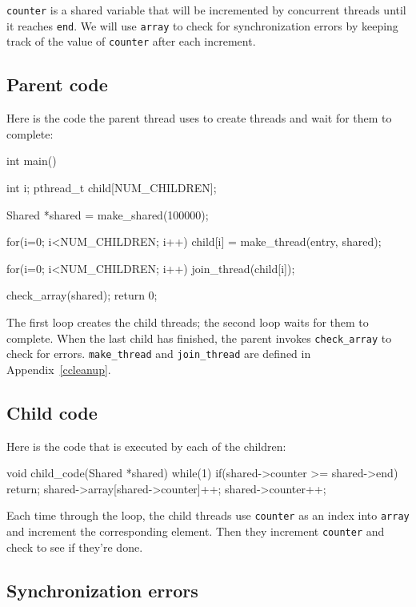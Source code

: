 \documentclass{book}
\begin{document}
{\tt counter} is a shared variable that will be incremented by
concurrent threads until it reaches {\tt end}.  We will use
    {\tt array} to check for synchronization errors by keeping track
of the value of {\tt counter} after each increment.

\subsection{Parent code}

Here is the code the parent thread uses to create threads
and wait for them to complete:

\begin{unbreakable}[title={}]{}
int main() {
 int i;
 pthread_t child[NUM_CHILDREN];

 Shared *shared = make_shared(100000);

 for(i=0; i<NUM_CHILDREN; i++) {
  child[i] = make_thread(entry, shared);
 }

 for(i=0; i<NUM_CHILDREN; i++) {
  join_thread(child[i]);
 }

 check_array(shared);
 return 0;
}
\end{unbreakable}

The first loop creates the child threads; the second loop waits
for them to complete.  When the last child has finished, the parent
invokes {\tt check\_array} to check for errors.
    {\tt make\_thread} and {\tt join\_thread} are defined in
Appendix~\ref{ccleanup}.

\subsection{Child code}

Here is the code that is executed by each of the children:

\begin{unbreakable}[title={}]{}
void child_code(Shared *shared) {
  while(1) {
    if(shared->counter >= shared->end) {
      return;
    }
    shared->array[shared->counter]++;
    shared->counter++;
  }
}
\end{unbreakable}

Each time through the loop, the child threads use {\tt counter}
as an index into {\tt array} and increment the corresponding element.
Then they increment {\tt counter} and check to see if they're done.

\subsection{Synchronization errors}
\end{document}
